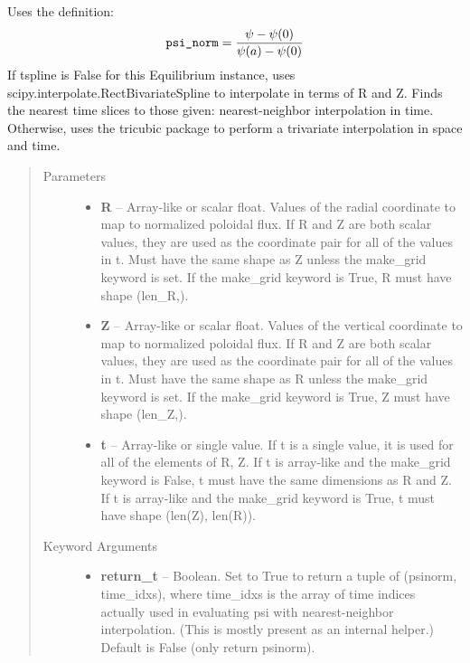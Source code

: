 \documentclass[letterpaper,10pt,english]{sphinxmanual}
\begin{document}
\begin{fulllineitems}
\begin{fulllineitems}
Uses the definition:
\begin{gather}
\begin{split}\texttt{psi\_norm} = \frac{\psi - \psi(0)}{\psi(a) - \psi(0)}\end{split}\notag
\end{gather}
If tspline is False for this Equilibrium instance, uses
scipy.interpolate.RectBivariateSpline to interpolate in terms of R and
Z. Finds the nearest time slices to those given: nearest-neighbor
interpolation in time. Otherwise, uses the tricubic package to perform
a trivariate interpolation in space and time.
\begin{quote}\begin{description}
\item[{Parameters }] \leavevmode\begin{itemize}
\item {} 
\textbf{R} --
Array-like or scalar float. Values of the radial coordinate to
map to normalized poloidal flux. If R and Z are both scalar
values, they are used as the coordinate pair for all of the
values in t. Must have the same shape as Z unless the make\_grid
keyword is set. If the make\_grid keyword is True, R must have
shape (len\_R,).

\item {} 
\textbf{Z} --
Array-like or scalar float. Values of the vertical coordinate to
map to normalized poloidal flux. If R and Z are both scalar
values, they are used as the coordinate pair for all of the
values in t. Must have the same shape as R unless the make\_grid
keyword is set. If the make\_grid keyword is True, Z must have
shape (len\_Z,).

\item {} 
\textbf{t} --
Array-like or single value. If t is a single value, it is used
for all of the elements of R, Z. If t is array-like and the
make\_grid keyword is False, t must have the same dimensions as
R and Z. If t is array-like and the make\_grid keyword is True,
t must have shape (len(Z), len(R)).

\end{itemize}

\item[{Keyword Arguments}] \leavevmode\begin{itemize}
\item {} 
\textbf{return\_t} --
Boolean. Set to True to return a tuple of (psinorm,
time\_idxs), where time\_idxs is the array of time indices
actually used in evaluating psi with nearest-neighbor
interpolation. (This is mostly present as an internal helper.)
Default is False (only return psinorm).


\end{itemize}
\end{description}
\end{quote}
\end{fulllineitems}
\end{fulllineitems}
\end{document}
